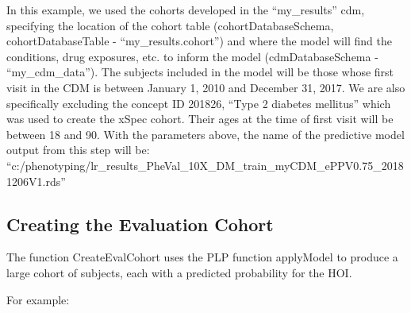 \documentclass[]{article}
\begin{document}
In this example, we used the cohorts developed in the ``my\_results''
cdm, specifying the location of the cohort table (cohortDatabaseSchema,
cohortDatabaseTable - ``my\_results.cohort'') and where the model will
find the conditions, drug exposures, etc. to inform the model
(cdmDatabaseSchema - ``my\_cdm\_data''). The subjects included in the
model will be those whose first visit in the CDM is between January 1,
2010 and December 31, 2017. We are also specifically excluding the
concept ID 201826, ``Type 2 diabetes mellitus'' which was used to create
the xSpec cohort. Their ages at the time of first visit will be between
18 and 90. With the parameters above, the name of the predictive model
output from this step will be:
``c:/phenotyping/lr\_results\_PheVal\_10X\_DM\_train\_myCDM\_ePPV0.75\_20181206V1.rds''

\hypertarget{creating-the-evaluation-cohort}{%
\subsection{Creating the Evaluation
Cohort}\label{creating-the-evaluation-cohort}}

The function CreateEvalCohort uses the PLP function applyModel to
produce a large cohort of subjects, each with a predicted probability
for the HOI.

For example:
\end{document}
